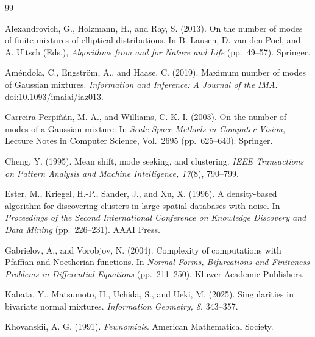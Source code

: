 \documentclass[11pt]{article}
\theoremstyle{plain}
\theoremstyle{definition}
\theoremstyle{remark}
\numberwithin{equation}{section}
\begin{document}
\begin{thebibliography}{99}

Alexandrovich, G., Holzmann, H., and Ray, S. (2013).
On the number of modes of finite mixtures of elliptical distributions.
In B. Lausen, D. van den Poel, and A. Ultsch (Eds.), \textit{Algorithms from and for Nature and Life} (pp.~49--57).
Springer.

Am{\'e}ndola, C., Engstr{\"o}m, A., and Haase, C. (2019).
Maximum number of modes of Gaussian mixtures.
\textit{Information and Inference: A Journal of the IMA}.
\href{https://doi.org/10.1093/imaiai/iaz013}{doi:10.1093/imaiai/iaz013}.

Carreira-Perpi{\~n}{\'a}n, M. A., and Williams, C. K. I. (2003).
On the number of modes of a Gaussian mixture.
In \textit{Scale-Space Methods in Computer Vision}, Lecture Notes in Computer Science, Vol.~2695 (pp.~625--640).
Springer.

Cheng, Y. (1995).
Mean shift, mode seeking, and clustering.
\textit{IEEE Transactions on Pattern Analysis and Machine Intelligence, 17}(8), 790--799.

Ester, M., Kriegel, H.-P., Sander, J., and Xu, X. (1996).
A density-based algorithm for discovering clusters in large spatial databases with noise.
In \textit{Proceedings of the Second International Conference on Knowledge Discovery and Data Mining} (pp.~226--231).
AAAI Press.

Gabrielov, A., and Vorobjov, N. (2004).
Complexity of computations with Pfaffian and Noetherian functions.
In \textit{Normal Forms, Bifurcations and Finiteness Problems in Differential Equations} (pp.~211--250).
Kluwer Academic Publishers.

Kabata, Y., Matsumoto, H., Uchida, S., and Ueki, M. (2025).
Singularities in bivariate normal mixtures.
\textit{Information Geometry, 8}, 343--357.

Khovanskii, A. G. (1991).
\textit{Fewnomials}.
American Mathematical Society.


\end{thebibliography}
\end{document}
